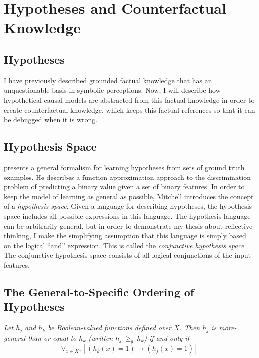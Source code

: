 \chapter{Hypotheses and Counterfactual Knowledge}
\label{chapter:hypotheses_and_counterfactual_knowledge}

\section{Hypotheses}

I have previously described grounded factual knowledge that has an
unquestionable basis in symbolic perceptions.  Now, I will describe
how hypothetical causal models are abstracted from this factual
knowledge in order to create counterfactual knowledge, which keeps
this factual references so that it can be debugged when it is wrong.

\section{Hypothesis Space}

\cite{mitchell:1997} presents a general formalism for learning
hypotheses from sets of ground truth examples.  He describes a
function approximation approach to the discrimination problem of
predicting a binary value given a set of binary features.  In order to
keep the model of learning as general as possible, Mitchell introduces
the concept of a \emph{hypothesis space}.  Given a language for
describing hypotheses, the hypothesis space includes all possible
expressions in this language.  The hypothesis language can be
arbitrarily general, but in order to demonstrate my thesis about
reflective thinking, I make the simplifying assumption that this
language is simply based on the logical ``and'' expression.  This is
called the \emph{conjunctive hypothesis space}.  The conjunctive
hypothesis space consists of all logical conjunctions of the input
features.

\section{The General-to-Specific Ordering of Hypotheses}

\begin{definition}
\emph{Let $h_j$ and $h_k$ be Boolean-valued functions defined over
  $X$. Then $h_j$ is more-general-than-or-equal-to $h_k$ (written
  $h_j\ \geq_g\ h_k$) if and only if
\begin{equation*}
\forall_{x \in X}, [(h_k(x) = 1) \rightarrow (h_j(x) = 1)]
\end{equation*}
}\end{definition}

